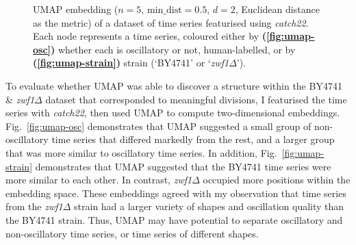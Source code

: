 \begin{figure}
  \caption[
      UMAP embedding of a dataset of time series featurised using \textit{catch22}.
    ]{
      UMAP embedding ($n=5$, $\mathrm{min\_dist} = 0.5$, $d=2$, Euclidean distance as the metric) of a dataset of time series featurised using \textit{catch22}.
      Each node represents a time series, coloured either by
      \textbf{(\ref{fig:umap-osc})}
      whether each is oscillatory or not, human-labelled, or by
      \textbf{(\ref{fig:umap-strain})}
      strain (`BY4741' or `\textit{zwf1$\Delta$}').
    }
  \label{fig:umap}
\end{figure}

To evaluate whether UMAP was able to discover a structure within the BY4741 \& \textit{zwf1$\Delta$} dataset that corresponded to meaningful divisions, I featurised the time series with \textit{catch22}, then used UMAP to compute two-dimensional embeddings.
Fig.\ \ref{fig:umap-osc} demonstrates that UMAP suggested a small group of non-oscillatory time series that differed markedly from the rest, and a larger group that was more similar to oscillatory time series.
In addition, Fig.\ \ref{fig:umap-strain} demonstrates that UMAP suggested that the BY4741 time series were more similar to each other.
In contrast, \textit{zwf1$\Delta$} occupied more positions within the embedding space.
These embeddings agreed with my observation that time series from the \textit{zwf1$\Delta$} strain had a larger variety of shapes and oscillation quality than the BY4741 strain.
Thus, UMAP may have potential to separate oscillatory and non-oscillatory time series, or time series of different shapes.


